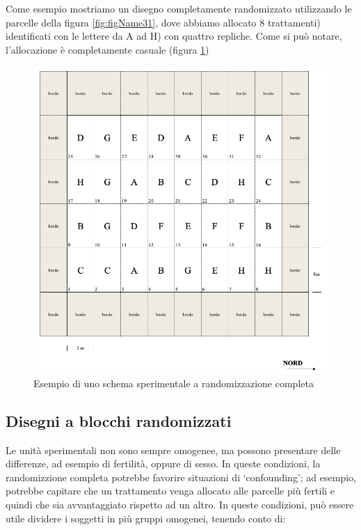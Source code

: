 \documentclass[a4paper,12pt,oneside]{book}
\begin{document}
Come esempio mostriamo un disegno completamente randomizzato utilizzando le parcelle della figura \ref{fig:figName31}, dove abbiamo allocato 8 trattamenti) identificati con le lettere da A ad H) con quattro repliche. Come si può notare, l'allocazione è completamente casuale (figura \ref{fig:figName33})

\begin{figure}

{\centering \includegraphics[width=0.9\linewidth]{_images/Mappa1CRD} 

}

\caption{Esempio di uno schema sperimentale a randomizzazione completa}\label{fig:figName33}
\end{figure}

\hypertarget{disegni-a-blocchi-randomizzati}{%
\subsection{Disegni a blocchi randomizzati}\label{disegni-a-blocchi-randomizzati}}

Le unità sperimentali non sono sempre omogenee, ma possono presentare delle differenze, ad esempio di fertilità, oppure di sesso. In queste condizioni, la randomizzione completa potrebbe favorire situazioni di `confounding'; ad esempio, potrebbe capitare che un trattamento venga allocato alle parcelle più fertili e quindi che sia avvantaggiato rispetto ad un altro. In queste condizioni, può essere utile dividere i soggetti in più gruppi omogenei, tenendo conto di:
\end{document}
